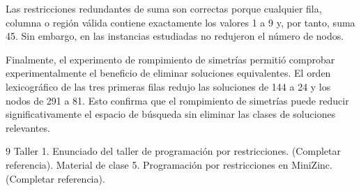 \documentclass[12pt]{article}
\begin{document}
Las restricciones redundantes de suma son correctas porque cualquier fila, columna o región válida contiene exactamente los valores 1 a 9 y, por tanto, suma 45. Sin embargo, en las instancias estudiadas no redujeron el número de nodos.

Finalmente, el experimento de rompimiento de simetrías permitió comprobar experimentalmente el beneficio de eliminar soluciones equivalentes. El orden lexicográfico de las tres primeras filas redujo las soluciones de 144 a 24 y los nodos de 291 a 81. Esto confirma que el rompimiento de simetrías puede reducir significativamente el espacio de búsqueda sin eliminar las clases de soluciones relevantes.

\begin{thebibliography}{9}
 Taller 1. Enunciado del taller de programación por restricciones. (Completar referencia).
 Material de clase 5. Programación por restricciones en MiniZinc. (Completar referencia).
\end{thebibliography}
\end{document}
